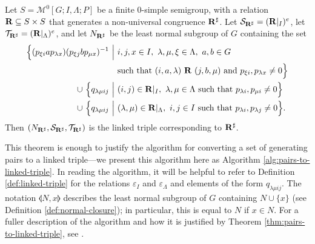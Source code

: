 \begin{theorem}
  \label{thm:pairs-to-linked-triple}
  Let $S = \mathcal{M}^0[G;I,\Lambda;P]$ be a finite 0-simple semigroup, with a
  relation $\mathbf{R} \subseteq S \times S$ that generates a non-universal
  congruence $\mathbf{R}^\sharp$.  Let
  $\mathcal{S}_{\mathbf{R}^\sharp} = (\mathbf{R}|_I)^e$, let
  $\mathcal{T}_{\mathbf{R}^\sharp} = (\mathbf{R}|_\Lambda)^e$, and let $N_{\mathbf{R}^\sharp}$ be
  the least normal subgroup of $G$ containing the set
  \begin{align*}
    \Big\{(p_{\xi i} a p_{\lambda x}) (p_{\xi j} b p_{\mu x})^{-1} ~\Big|~
    & i,j,x \in I,\ \lambda, \mu, \xi \in \Lambda,\ a,b \in G \\
    & \text{such that~} (i,a,\lambda) ~\mathbf{R}~ (j,b,\mu) \text{~and~}
      p_{\xi i}, p_{\lambda x} \neq 0\Big\} \\
    \cup~ \Big\{q_{\lambda \mu i j} ~\Big|~ &
           (i,j) \in \mathbf{R}|_I,~
           \lambda,\mu \in \Lambda ~\textnormal{such that}~
           p_{\lambda i}, p_{\mu i} \neq 0\Big\} \\
    \cup~ \Big\{q_{\lambda \mu i j} ~\Big|~ &
           (\lambda,\mu) \in \mathbf{R}|_\Lambda,~
           i,j \in I ~\textnormal{such that}~
           p_{\lambda i}, p_{\lambda j} \neq 0\Big\}. \\
  \end{align*}
  Then $(N_{\mathbf{R}^\sharp}, \mathcal{S}_{\mathbf{R}^\sharp}, \mathcal{T}_{\mathbf{R}^\sharp})$
  is the linked triple corresponding to $\mathbf{R}^\sharp$.
\end{theorem}

This theorem is enough to justify the algorithm for converting a set of
generating pairs to a linked triple---we present this algorithm here as Algorithm
\ref{alg:pairs-to-linked-triple}.  In reading the algorithm, it will be helpful
to refer to Definition \ref{def:linked-triple} for the relations $\varepsilon_I$
and $\varepsilon_\Lambda$ and elements of the form $q_{\lambda \mu i j}$.
The notation $\llangle N, x \rrangle$ describes the least normal subgroup of $G$
containing $N \cup \{x\}$ (see Definition \ref{def:normal-closure}); in
particular, this is equal to $N$ if $x \in N$.
For a fuller description of the algorithm and how it is justified by Theorem
\ref{thm:pairs-to-linked-triple}, see \cite[\S 3.2]{mtorpey_msc}.


